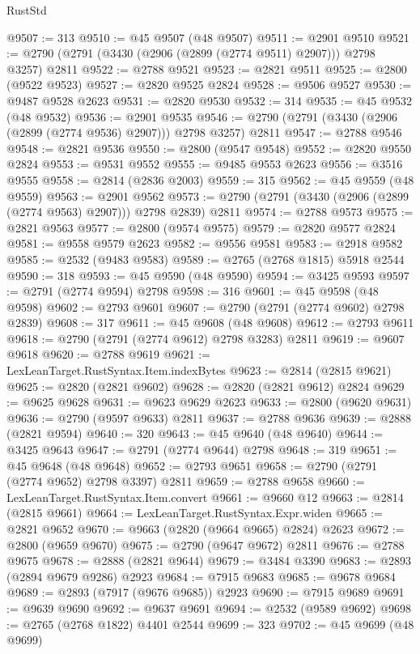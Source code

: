 \begin{lexlean}{RustStd}
\begin{coremodule}
@9507 := 313
@9510 := @45 @9507 (@48 @9507)
@9511 := @2901 @9510
@9521 := @2790 (@2791 (@3430 (@2906 (@2899 (@2774 @9511) @2907))) @2798 @3257) @2811
@9522 := @2788 @9521
@9523 := @2821 @9511
@9525 := @2800 (@9522 @9523)
@9527 := @2820 @9525 @2824
@9528 := @9506 @9527
@9530 := @9487 @9528 @2623
@9531 := @2820 @9530
@9532 := 314
@9535 := @45 @9532 (@48 @9532)
@9536 := @2901 @9535
@9546 := @2790 (@2791 (@3430 (@2906 (@2899 (@2774 @9536) @2907))) @2798 @3257) @2811
@9547 := @2788 @9546
@9548 := @2821 @9536
@9550 := @2800 (@9547 @9548)
@9552 := @2820 @9550 @2824
@9553 := @9531 @9552
@9555 := @9485 @9553 @2623
@9556 := @3516 @9555
@9558 := @2814 (@2836 @2003)
@9559 := 315
@9562 := @45 @9559 (@48 @9559)
@9563 := @2901 @9562
@9573 := @2790 (@2791 (@3430 (@2906 (@2899 (@2774 @9563) @2907))) @2798 @2839) @2811
@9574 := @2788 @9573
@9575 := @2821 @9563
@9577 := @2800 (@9574 @9575)
@9579 := @2820 @9577 @2824
@9581 := @9558 @9579 @2623
@9582 := @9556 @9581
@9583 := @2918 @9582
@9585 := @2532 (@9483 @9583)
@9589 := @2765 (@2768 @1815) @5918 @2544
@9590 := 318
@9593 := @45 @9590 (@48 @9590)
@9594 := @3425 @9593
@9597 := @2791 (@2774 @9594) @2798
@9598 := 316
@9601 := @45 @9598 (@48 @9598)
@9602 := @2793 @9601
@9607 := @2790 (@2791 (@2774 @9602) @2798 @2839)
@9608 := 317
@9611 := @45 @9608 (@48 @9608)
@9612 := @2793 @9611
@9618 := @2790 (@2791 (@2774 @9612) @2798 @3283) @2811
@9619 := @9607 @9618
@9620 := @2788 @9619
@9621 := LexLeanTarget.RustSyntax.Item.indexBytes
@9623 := @2814 (@2815 @9621)
@9625 := @2820 (@2821 @9602)
@9628 := @2820 (@2821 @9612) @2824
@9629 := @9625 @9628
@9631 := @9623 @9629 @2623
@9633 := @2800 (@9620 @9631)
@9636 := @2790 (@9597 @9633) @2811
@9637 := @2788 @9636
@9639 := @2888 (@2821 @9594)
@9640 := 320
@9643 := @45 @9640 (@48 @9640)
@9644 := @3425 @9643
@9647 := @2791 (@2774 @9644) @2798
@9648 := 319
@9651 := @45 @9648 (@48 @9648)
@9652 := @2793 @9651
@9658 := @2790 (@2791 (@2774 @9652) @2798 @3397) @2811
@9659 := @2788 @9658
@9660 := LexLeanTarget.RustSyntax.Item.convert
@9661 := @9660 @12
@9663 := @2814 (@2815 @9661)
@9664 := LexLeanTarget.RustSyntax.Expr.widen
@9665 := @2821 @9652
@9670 := @9663 (@2820 (@9664 @9665) @2824) @2623
@9672 := @2800 (@9659 @9670)
@9675 := @2790 (@9647 @9672) @2811
@9676 := @2788 @9675
@9678 := @2888 (@2821 @9644)
@9679 := @3484 @3390
@9683 := @2893 (@2894 @9679 @9286) @2923
@9684 := @7915 @9683
@9685 := @9678 @9684
@9689 := @2893 (@7917 (@9676 @9685)) @2923
@9690 := @7915 @9689
@9691 := @9639 @9690
@9692 := @9637 @9691
@9694 := @2532 (@9589 @9692)
@9698 := @2765 (@2768 @1822) @4401 @2544
@9699 := 323
@9702 := @45 @9699 (@48 @9699)

\end{coremodule}
\end{lexlean}
